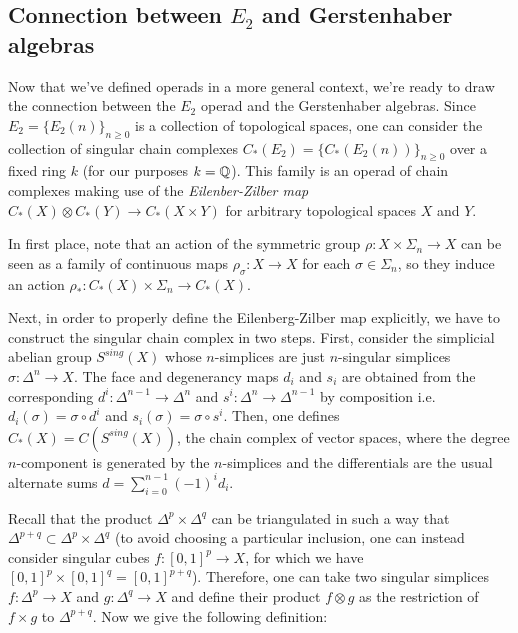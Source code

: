 \documentclass[TFM.tex]{subfiles}
\begin{document}
\subsection{Connection between $E_2$ and Gerstenhaber algebras}\label{zilber}

Now that we've defined operads in a more general context, we're ready to draw the connection between the $E_2$ operad and the Gerstenhaber algebras. Since $E_2=\{E_2(n)\}_{n\geq 0}$ is a collection of topological spaces, one can consider the collection of singular chain complexes $C_*(E_2)=\{C_*(E_2(n))\}_{n\geq 0}$ over a fixed ring $k$ (for our purposes $k=\mathbb{Q}$). This family is an operad of chain complexes making use of the \emph{Eilenber-Zilber map} \cite{EZ} $C_*(X)\otimes C_*(Y)\to C_*(X\times Y)$ for arbitrary topological spaces $X$ and $Y$. 

In first place, note that an action of the symmetric group $\rho:X\times\Sigma_n\to X$ can be seen as a family of continuous maps $\rho_\sigma:X\to X$ for each $\sigma\in\Sigma_n$, so they induce an action $\rho_*: C_*(X)\times\Sigma_n\to C_*(X)$. %

Next, in order to properly define the Eilenberg-Zilber map explicitly, we have to construct the singular chain complex in two steps. First, consider the simplicial abelian group $S^{sing}(X)$ whose $n$-simplices are just $n$-singular simplices $\sigma:\Delta^n\to X$. The face and degenerancy maps $d_i$ and $s_i$ are obtained from the corresponding $d^i:\Delta^{n-1}\to \Delta^{n}$ and $s^i:\Delta^n\to\Delta^{n-1}$ by composition i.e. $d_i(\sigma)=\sigma\circ d^i$ and $s_i(\sigma)=\sigma\circ s^i$. Then, one defines $C_*(X)=C(S^{sing}(X))$, the chain complex of vector spaces, where the degree $n$-component is generated by the $n$-simplices and the differentials are the usual alternate sums $d=\sum_{i=0}^{n-1}(-1)^id_i$. 

Recall that the product $\Delta^p\times\Delta^q$ can be triangulated in such a way that $\Delta^{p+q}\subset \Delta^p\times\Delta^q$ \cite{Hatcher} (to avoid choosing a particular inclusion, one can instead consider singular cubes $f:[0,1]^p\to X$, for which we have $[0,1]^p\times [0,1]^q=[0,1]^{p+q}$). Therefore, one can take two singular simplices $f:\Delta^p\to X$ and $g:\Delta^q\to X$ and define their product $f\otimes g$ as the restriction of $f\times g$ to $\Delta^{p+q}$. Now we give the following definition:
\end{document}
